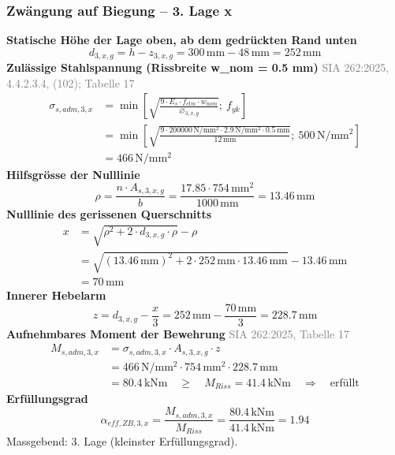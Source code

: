 \documentclass[11pt,a4paper]{article}
\newcommand{\normref}[1]{{\small\textcolor{gray}{#1}}}
\begin{document}
\subsubsection{Zwängung auf Biegung – 3. Lage x}
\noindent\textbf{Statische Höhe der Lage oben, ab dem gedrückten Rand unten}
\begin{equation*}
d_{3,x,g} = h - z_{3,x,g} = 300\,\mathrm{mm} - 48\,\mathrm{mm} = 252\,\mathrm{mm}
\end{equation*}
\noindent\textbf{Zulässige Stahlspannung (Rissbreite w\_nom = 0.5 mm)} \hfill \normref{SIA 262:2025, 4.4.2.3.4, (102); Tabelle 17}
\begin{equation*}
\begin{aligned}
  \sigma_{s,adm,3,x} &= \min\left[\sqrt{\frac{9 \cdot E_s \cdot f_{ctm} \cdot w_{nom}}{\varnothing_{3,x,g}}};\ f_{yk}\right] \\
  &= \min\left[\sqrt{\frac{9 \cdot 200000\,\mathrm{N}/\mathrm{mm}^{2} \cdot 2.9\,\mathrm{N}/\mathrm{mm}^{2} \cdot 0.5\,\mathrm{mm}}{12\,\mathrm{mm}}};\ 500\,\mathrm{N}/\mathrm{mm}^{2}\right] \\
  &= 466\,\mathrm{N}/\mathrm{mm}^{2}
\end{aligned}
\end{equation*}
\noindent\textbf{Hilfsgrösse der Nulllinie}
\begin{equation*}
\rho = \frac{n \cdot A_{s,3,x,g}}{b} = \frac{17.85 \cdot 754\,\mathrm{mm}^{2}}{1000\,\mathrm{mm}} = 13.46\,\mathrm{mm}
\end{equation*}
\noindent\textbf{Nulllinie des gerissenen Querschnitts}
\begin{equation*}
\begin{aligned}
  x &= \sqrt{\rho^{2} + 2 \cdot d_{3,x,g} \cdot \rho} - \rho \\
  &= \sqrt{\left(13.46\,\mathrm{mm}\right)^{2} + 2 \cdot 252\,\mathrm{mm} \cdot 13.46\,\mathrm{mm}} - 13.46\,\mathrm{mm} \\
  &= 70\,\mathrm{mm}
\end{aligned}
\end{equation*}
\noindent\textbf{Innerer Hebelarm}
\begin{equation*}
z = d_{3,x,g} - \frac{x}{3} = 252\,\mathrm{mm} - \frac{70\,\mathrm{mm}}{3} = 228.7\,\mathrm{mm}
\end{equation*}
\noindent\textbf{Aufnehmbares Moment der Bewehrung} \hfill \normref{SIA 262:2025, Tabelle 17}
\begin{equation*}
\begin{aligned}
  M_{s,adm,3,x} &= \sigma_{s,adm,3,x} \cdot A_{s,3,x,g} \cdot z \\
  &= 466\,\mathrm{N}/\mathrm{mm}^{2} \cdot 754\,\mathrm{mm}^{2} \cdot 228.7\,\mathrm{mm} \\
  &= 80.4\,\mathrm{kNm} \quad \ge \quad M_{Riss} = 41.4\,\mathrm{kNm} \quad \Rightarrow \quad \text{erfüllt}
\end{aligned}
\end{equation*}
\noindent\textbf{Erfüllungsgrad}
\begin{equation*}
\alpha_{eff,ZB,3,x} = \frac{M_{s,adm,3,x}}{M_{Riss}} = \frac{80.4\,\mathrm{kNm}}{41.4\,\mathrm{kNm}} = 1.94
\end{equation*}
Massgebend: 3. Lage (kleinster Erfüllungsgrad).
\end{document}
